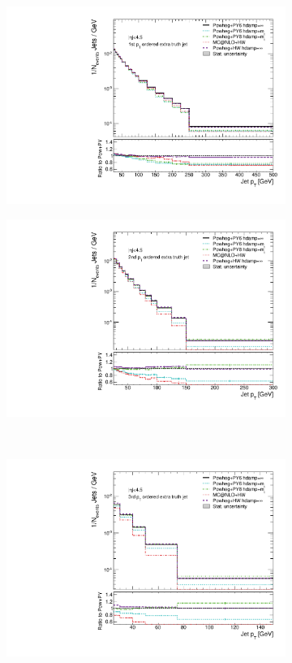 \begin{figure}
\centering
\begin{subfigure}[]{0.33\textwidth}
\includegraphics[width=\textwidth]{fig/MCComp/NLO/TruthPtJet0.pdf}
\end{subfigure}
\begin{subfigure}[]{0.33\textwidth}
\includegraphics[width=\textwidth]{fig/MCComp/NLO/TruthPtJet1.pdf}
\end{subfigure}
\\
\begin{subfigure}[]{0.33\textwidth}
\includegraphics[width=\textwidth]{fig/MCComp/NLO/TruthPtJet2.pdf}

\end{subfigure}
\end{figure}
